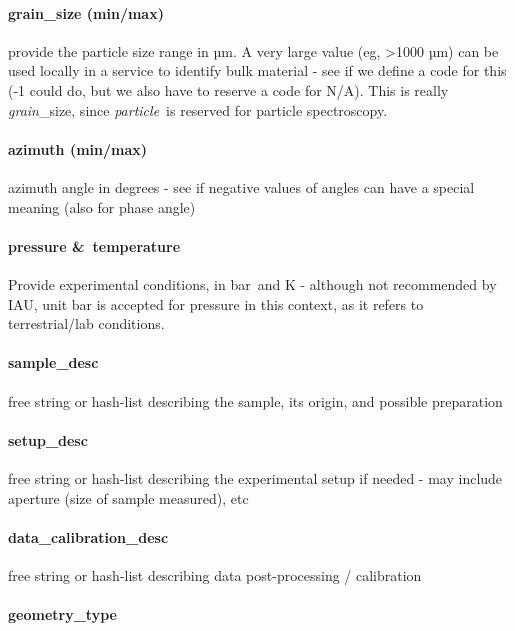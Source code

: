 \documentclass[11pt,a4paper]{ivoa}
\begin{document}
\paragraph{grain\_size (min/max)}

provide the particle size range in µm. A very large value (eg, >1000 µm) can be used locally in a service to identify bulk material - see if we define a code for this (-1 could do, but we also have to reserve a code for N/A). This is really \emph{grain}\_size, since \emph{particle} is reserved for particle spectroscopy.\\

\paragraph{azimuth (min/max)}

azimuth angle in degrees - see if negative values of angles can have a special meaning (also for phase angle)

\paragraph{pressure \& temperature}

Provide experimental conditions, in bar and K - although not recommended by IAU, unit bar is accepted for pressure in this context, as it refers to terrestrial/lab conditions.

\paragraph{sample\_desc}

free string or hash-list describing the sample, its origin, and possible preparation

\paragraph{setup\_desc}

free string or hash-list describing the experimental setup if needed - may include aperture (size of sample measured), etc

\paragraph{data\_calibration\_desc}

free string or hash-list describing data post-processing / calibration

\paragraph{geometry\_type}
\end{document}
